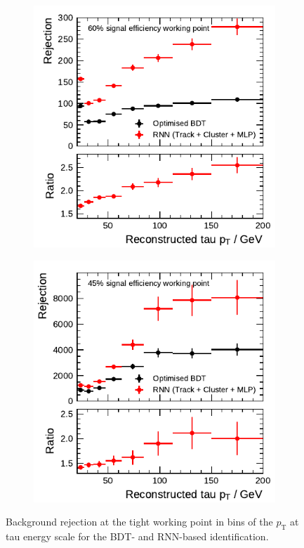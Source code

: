 \begin{figure}[htb]
  \begin{subfigure}[t]{0.48\textwidth}
    \centering
    \includegraphics{./figures/rnn/combined/rnn_tight_1p.pdf}
  \end{subfigure}\hfill
  \begin{subfigure}[t]{0.48\textwidth}
    \centering
    \includegraphics{./figures/rnn/combined/rnn_tight_3p.pdf}
  \end{subfigure}
  \caption[Background rejection of the tight working point in bins of
  \tauhadvis~\pt for the RNN-based identification]{Background rejection
    at the tight working point in bins of the \tauhadvis $p_\text{T}$ at tau
    energy scale for the BDT- and RNN-based identification.}
  \label{fig:combined_working_points}
\end{figure}

